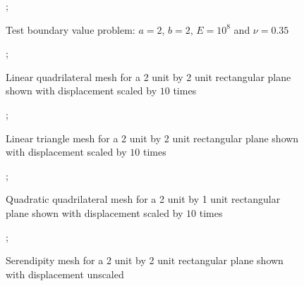 \documentclass{article}
\begin{document}
\begin{figure}
    ;
    \caption{Test boundary value problem: $a = 2$, $b = 2$, $E = 10^8$ and $\nu = 0.35$}
\centering
\end{figure}

\begin{figure}
    ;
    \caption{Linear quadrilateral mesh for a 2 unit by 2 unit rectangular plane shown with displacement scaled by $10$ times}
\centering
\end{figure}

\begin{figure}
    ;
    \caption{Linear triangle mesh for a 2 unit by 2 unit rectangular plane shown with displacement scaled by $10$ times}
\centering
\end{figure}

\begin{figure}
    ;
    \caption{Quadratic quadrilateral mesh for a 2 unit by 1 unit rectangular plane shown with displacement scaled by $10$ times}
\centering
\end{figure}


\begin{figure}
    ;
    \caption{Serendipity mesh for a 2 unit by 2 unit rectangular plane shown with displacement unscaled}
\centering
\end{figure}
\end{document}

